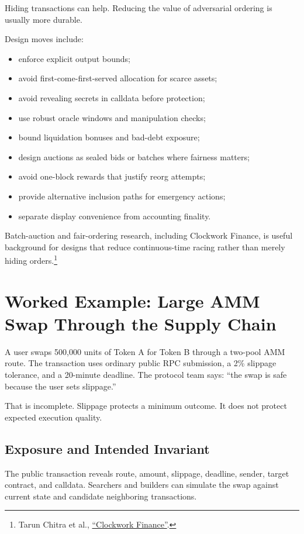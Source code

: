 Hiding transactions can help. Reducing the value of adversarial ordering is usually more durable.

Design moves include:

\begin{itemize}
\item enforce explicit output bounds;
\item avoid first-come-first-served allocation for scarce assets;
\item avoid revealing secrets in calldata before protection;
\item use robust oracle windows and manipulation checks;
\item bound liquidation bonuses and bad-debt exposure;
\item design auctions as sealed bids or batches where fairness matters;
\item avoid one-block rewards that justify reorg attempts;
\item provide alternative inclusion paths for emergency actions;
\item separate display convenience from accounting finality.
\end{itemize}

Batch-auction and fair-ordering research, including Clockwork Finance, is useful background for designs that reduce continuous-time racing rather than merely hiding orders.\footnote{Tarun Chitra et al., \href{https://arxiv.org/abs/2109.04347}{``Clockwork Finance''}.}

\section{Worked Example: Large AMM Swap Through the Supply Chain}

A user swaps 500,000 units of Token A for Token B through a two-pool AMM route. The transaction uses ordinary public RPC submission, a 2\% slippage tolerance, and a 20-minute deadline. The protocol team says: ``the swap is safe because the user sets slippage.''

That is incomplete. Slippage protects a minimum outcome. It does not protect expected execution quality.

\subsection{Exposure and Intended Invariant}

The public transaction reveals route, amount, slippage, deadline, sender, target contract, and calldata. Searchers and builders can simulate the swap against current state and candidate neighboring transactions.

